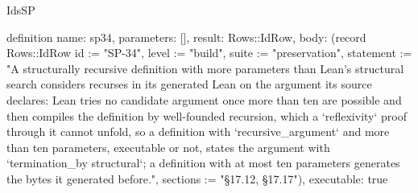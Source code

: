 \begin{lexlean}{IdsSP}
\begin{semanticmodule}
definition{
  name: sp34,
  parameters: [],
  result: Rows::IdRow,
  body: (record Rows::IdRow {id := "SP-34", level := "build", suite := "preservation", statement := "A structurally recursive definition with more parameters than Lean's structural search considers recurses in its generated Lean on the argument its source declares: Lean tries no candidate argument once more than ten are possible and then compiles the definition by well-founded recursion, which a `reflexivity` proof through it cannot unfold, so a definition with `recursive_argument` and more than ten parameters, executable or not, states the argument with `termination_by structural`; a definition with at most ten parameters generates the bytes it generated before.", sections := "§17.12, §17.17"}),
  executable: true
}
\end{semanticmodule}
\end{lexlean}
